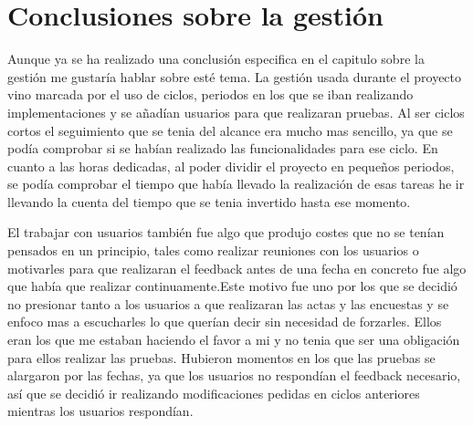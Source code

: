 \section{Conclusiones sobre la gestión}
\label{secc:Conclusiones sobre la gestión}

Aunque ya se ha realizado una conclusión especifica en el capitulo sobre la gestión me gustaría hablar sobre esté tema. La gestión usada durante el proyecto vino marcada por el uso de ciclos, periodos en los que se iban realizando implementaciones y se añadían usuarios para que realizaran pruebas. Al ser ciclos cortos el seguimiento que se tenia del alcance era mucho mas sencillo, ya que se podía comprobar si se habían realizado las funcionalidades para ese ciclo. En cuanto a las horas dedicadas, al poder dividir el proyecto en pequeños periodos, se podía comprobar el tiempo que había llevado la realización de esas tareas he ir llevando la cuenta del tiempo que se tenia invertido hasta ese momento. 

El trabajar con usuarios también fue algo que produjo costes que no se tenían pensados en un principio, tales como realizar reuniones con los usuarios o motivarles para que realizaran el feedback antes de una fecha en concreto fue algo que había que realizar continuamente.Este motivo fue uno por los que se decidió no presionar tanto a los usuarios a que realizaran las actas y las encuestas y se enfoco mas a escucharles lo que querían decir sin necesidad de forzarles. Ellos eran los que me estaban haciendo el favor a mi y no tenia que ser una obligación para ellos realizar las pruebas. Hubieron momentos en los que las pruebas se alargaron por las fechas, ya que los usuarios no respondían el feedback necesario, así que se decidió ir realizando modificaciones pedidas en ciclos anteriores mientras los usuarios respondían.


